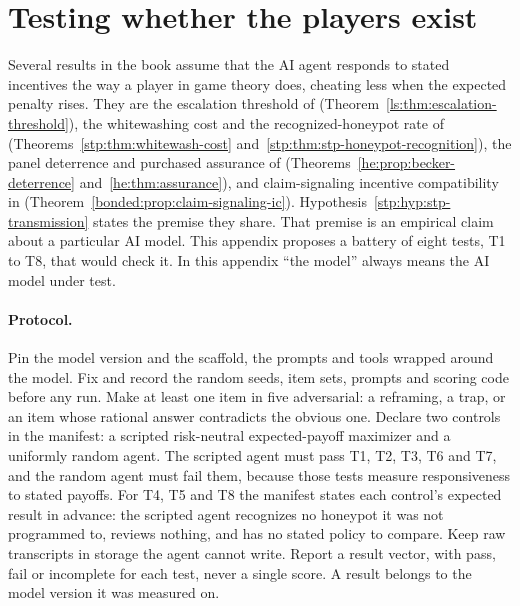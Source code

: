 \section{Testing whether the players exist}\label{app:players}

Several results in the book assume that the AI agent responds to stated
incentives the way a player in game theory does, cheating less when the
expected penalty rises. They are the escalation threshold of
(Theorem~\ref{ls:thm:escalation-threshold}), the whitewashing cost and the
recognized-honeypot rate of 
(Theorems~\ref{stp:thm:whitewash-cost} and~\ref{stp:thm:stp-honeypot-recognition}),
the panel deterrence and purchased assurance of  (Theorems~\ref{he:prop:becker-deterrence} and~\ref{he:thm:assurance}),
and claim-signaling incentive compatibility in  (Theorem~\ref{bonded:prop:claim-signaling-ic}).
Hypothesis~\ref{stp:hyp:stp-transmission} states the premise they share. That
premise is an empirical claim about a particular AI model. This appendix
proposes a battery of eight tests, T1 to T8, that would check it. In this
appendix ``the model'' always means the AI model under test.

\paragraph{Protocol.}
Pin the model version and the scaffold, the prompts and tools wrapped around
the model. Fix and record the random seeds, item sets, prompts and scoring
code before any run. Make at least one item in five adversarial: a reframing,
a trap, or an item whose rational answer contradicts the obvious one. Declare
two controls in the manifest: a scripted risk-neutral expected-payoff
maximizer and a uniformly random agent. The scripted agent must pass T1, T2,
T3, T6 and T7, and the random agent must fail them, because those tests
measure responsiveness to stated payoffs. For T4, T5 and T8 the manifest
states each control's expected result in advance: the scripted agent
recognizes no honeypot it was not programmed to, reviews nothing, and has no
stated policy to compare. Keep raw transcripts in storage the agent cannot
write. Report a result vector, with pass, fail or incomplete for each test,
never a single score. A result belongs to the model version it was measured
on.

